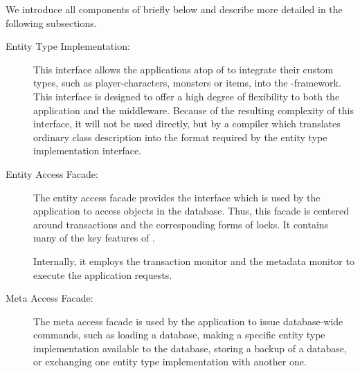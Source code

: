 \documentclass[a4paper, 10pt]{book}
\begin{document}
                We introduce all components of \SYNEIGHT briefly below and describe more
                detailed in the following subsections. 
                \begin{description}
                    \item [Entity Type Implementation:] This interface allows the
                        applications atop of \SYNEIGHT to integrate their custom types, such as
                        player-characters, monsters or items, into the \SYNEIGHT-framework.
                        This interface is designed to offer a high degree of flexibility to
                        both the application and the middleware. Because of the resulting
                        complexity of this interface, it will not be used directly, but by a
                        compiler which translates ordinary class description into the format
                        required by the entity type implementation interface.
                    \item [Entity Access Facade:] The entity access facade provides the
                        interface which is used by the application to access objects in the
                        database.  Thus, this facade is centered around transactions and the
                        corresponding forms of locks. It contains many of the key features
                        of \SYNEIGHT.

                        Internally, it employs the transaction monitor and the metadata
                        monitor to execute the application requests.
                    \item [Meta Access Facade:] The meta access facade is used by
                        the application to issue database-wide commands, such as loading a
                        database, making a specific entity type implementation available to
                        the database, storing a backup of a database, or exchanging one
                        entity type implementation with another one.


\end{description}
\end{document}
